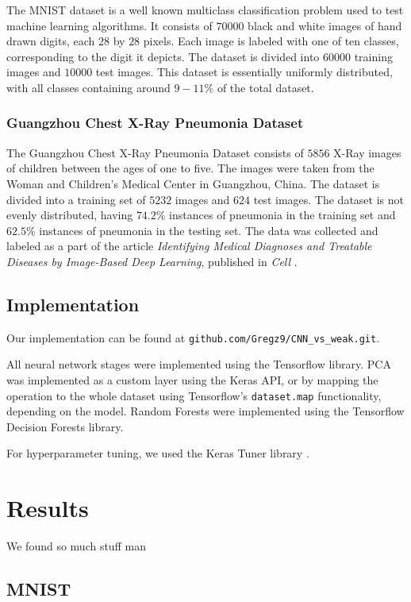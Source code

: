 \documentclass[onecolumn,10pt,cleanfoot]{asme2ej}
\begin{document}
The MNIST dataset is a well known multiclass classification problem used to test machine learning algorithms. It consists of $70000$ black and white images of hand drawn digits, each $28$ by $28$ pixels. Each image is labeled with one of ten classes, corresponding to the digit it depicts. The dataset is divided into $60000$ training images and $10000$ test images. This dataset is essentially uniformly distributed, with all classes containing around $9 - 11\%$ of the total dataset.

\subsubsection{Guangzhou Chest X-Ray Pneumonia Dataset}

The Guangzhou Chest X-Ray Pneumonia Dataset consists of $5856$ X-Ray images of children between the ages of one to five. The images were taken from the Woman and Children's Medical Center in Guangzhou, China. The dataset is divided into a training set of $5232$ images and $624$ test images. The dataset is not evenly distributed, having $74.2\%$ instances of pneumonia in the training set and $62.5\%$ instances of pneumonia in the testing set. The data was collected and labeled as a part of the article {\it Identifying Medical Diagnoses and Treatable Diseases by Image-Based Deep Learning}, published in {\it Cell} \cite{xray}.

\subsection{Implementation}

Our implementation can be found at \texttt{github.com/Gregz9/CNN\_vs\_weak.git}.

All neural network stages were implemented using the Tensorflow library. PCA was implemented as a custom layer using the Keras API, or by mapping the operation to the whole dataset using Tensorflow's \texttt{dataset.map} functionality, depending on the model. Random Forests were implemented using the Tensorflow Decision Forests library.

For hyperparameter tuning, we used the Keras Tuner library \cite{kerastuner}.

\section{Results}

We found so much stuff man

\subsection{MNIST}
\end{document}

